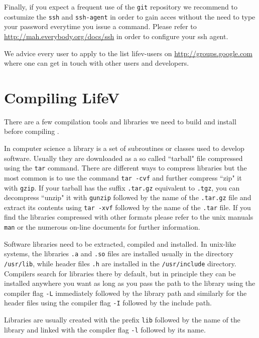 Finally, if you expect a frequent use of the \verb!git! repository 
we recommend to costumize the 
\verb!ssh! and \verb!ssh-agent!
 in order to gain acces  without the need to type your password everytime you issue
a command. Please refer to \url{http://mah.everybody.org/docs/ssh} in order to configure
your ssh agent.

We advice every user to apply to the list lifev-users on \url{http://groups.google.com} 
where one can get in touch with other users and developers.  

\section{Compiling LifeV}
\label{compile-lifev}

There are a few compilation tools and libraries we need to build and install before 
compiling \lifev. 

In computer science a library is a set of subroutines or classes used to develop software. 
Usually they are downloaded as a so called ``tarball" file  
compressed using the \verb!tar! command. There are different ways to compress 
libraries but the most common is to use the command \verb!tar -cvf! and further compress 
``zip" it with \verb!gzip!. If your tarball has the suffix \verb!.tar.gz! equivalent to \verb!.tgz!,
you can decompress ``unzip" it with \verb!gunzip! followed by the name of the \verb!.tar.gz! file and 
extract its contents using \verb!tar -xvf! followed by the name of the \verb!.tar! file.
If you find the libraries compressed with other formats 
please refer to the unix manuals \verb!man! or the numerous 
on-line documents for further information. 

Software libraries need to be extracted, compiled and installed. In unix-like 
systems, the libraries \verb!.a! and 
\verb!.so! files are installed usually in the directory \verb!/usr/lib!, 
 while header files 
\verb!.h! are installed in the \verb!/usr/include! directory. Compilers search  
for libraries there by default, but in principle they can be installed anywhere you want 
as long as you pass the path to the library using the compiler flag \verb!-L! immediately 
followed by the library path and similarly for the header files using the compiler 
flag \verb!-I! followed by the include path. 

Libraries are usually created with the prefix \verb!lib! followed by the name of the library
and linked with the compiler flag \verb!-l! followed by its name. 

